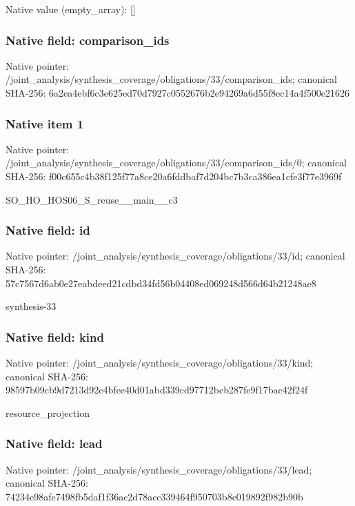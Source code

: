 \documentclass[10pt,a4paper]{article}
\begin{document}
Native value (empty\_\allowbreak{}array): []

\subsubsection{Native field: comparison\_\allowbreak{}ids}
Native pointer: /joint\_\allowbreak{}analysis/synthesis\_\allowbreak{}coverage/obligations/33/comparison\_\allowbreak{}ids; canonical SHA-256: 6a2ea4ebf6c3e625ed70d7927c0552676b2e94269a6d55f8ec14a4f500e21626

\subsubsection{Native item 1}
Native pointer: /joint\_\allowbreak{}analysis/synthesis\_\allowbreak{}coverage/obligations/33/comparison\_\allowbreak{}ids/0; canonical SHA-256: f00c655c4b38f125f77a8ce20a6fddbaf7d204bc7b3ca386ea1cfe3f77e3969f

\begingroup\raggedright\sloppy SO\_\allowbreak{}HO\_\allowbreak{}HOS06\_\allowbreak{}S\_\allowbreak{}reuse\_\allowbreak{}\_\allowbreak{}main\_\allowbreak{}\_\allowbreak{}c3\par\endgroup

\subsubsection{Native field: id}
Native pointer: /joint\_\allowbreak{}analysis/synthesis\_\allowbreak{}coverage/obligations/33/id; canonical SHA-256: 57c7567d6ab0e27eabdeed21cdbd34fd56b04408ed069248d566d64b21248ae8

\begingroup\raggedright\sloppy synthesis-33\par\endgroup

\subsubsection{Native field: kind}
Native pointer: /joint\_\allowbreak{}analysis/synthesis\_\allowbreak{}coverage/obligations/33/kind; canonical SHA-256: 98597b09cb9d7213d92c4bfee40d01abd339cd97712bcb287fe9f17bac42f24f

\begingroup\raggedright\sloppy resource\_\allowbreak{}projection\par\endgroup

\subsubsection{Native field: lead}
Native pointer: /joint\_\allowbreak{}analysis/synthesis\_\allowbreak{}coverage/obligations/33/lead; canonical SHA-256: 74234e98afe7498fb5daf1f36ac2d78acc339464f950703b8c019892f982b90b
\end{document}
